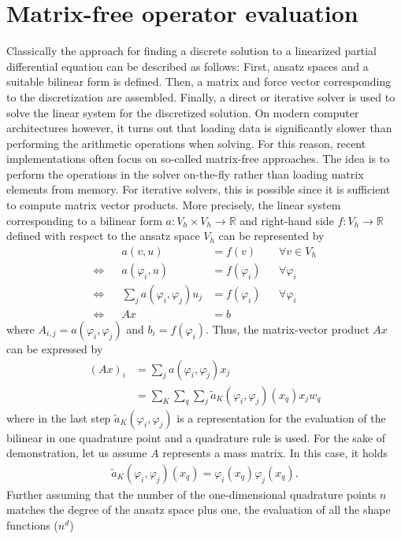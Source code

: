 \documentclass[preprint,12pt,times]{elsarticle}
\begin{document}
\section{Matrix-free operator evaluation}
Classically the approach for finding a discrete solution to a linearized partial differential equation can be described as follows:
First, ansatz spaces and a suitable bilinear form is defined. Then, a matrix and force vector corresponding to the discretization are assembled.
Finally, a direct or iterative solver is used to solve the linear system for the discretized solution.
On modern computer architectures however, it turns out that loading data is significantly slower than performing the arithmetic operations when solving.
For this reason, recent implementations often focus on so-called matrix-free approaches. The idea is to perform the operations in the solver on-the-fly
rather than loading matrix elements from memory.
For iterative solvers, this is possible since it is sufficient to compute matrix vector products. More precisely, the linear system corresponding to a bilinear form
$a\colon V_h\times V_h\to\mathbb{R}$ and right-hand side $f\colon V_h\to\mathbb{R}$ defined with respect to the ansatz space $V_h$ can be represented by
\begin{align*}
 &&a(v,u) &= f(v) && \forall v\in V_h\\
 \Longleftrightarrow &&a(\varphi_i, u) &= f(\varphi_i) && \forall \varphi_i \\
 \Longleftrightarrow &&\sum_j a(\varphi_i,\varphi_j) u_j &= f(\varphi_i) && \forall \varphi_i \\
 \Longleftrightarrow &&A x &= b
\end{align*}
where $A_{i,j}=a(\varphi_i, \varphi_j)$ and $b_i= f(\varphi_i)$.
Thus, the matrix-vector product $Ax$ can be expressed by
\begin{align*}
 (Ax)_i &= \sum_j a(\varphi_i,\varphi_j) x_j \\
        &= \sum_K\sum_q \sum_j \tilde{a}_K(\varphi_i,\varphi_j)(x_q) x_j w_q
\end{align*}
where in the last step $\tilde{a}_K(\varphi_i,\varphi_j)$ is a representation for the evaluation of the bilinear in one quadrature point and a quadrature rule is used.
For the sake of demonstration, let us assume $A$ represents a mass matrix. In this case, it holds
\begin{align*}
 \tilde{a}_K(\varphi_i,\varphi_j)(x_q) = \varphi_i(x_q)\varphi_j(x_q).
\end{align*}
Further assuming that the number of the one-dimensional quadrature points $n$ matches the degree of the ansatz space plus one, the evaluation of all the shape functions ($n^d$)
\end{document}
